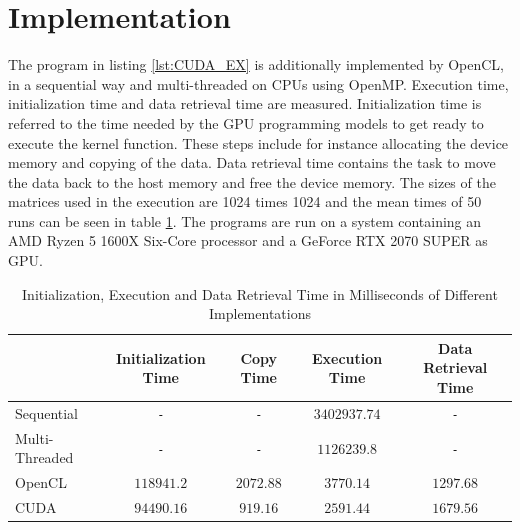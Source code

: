 \section{Implementation}
The program in listing \ref{lst:CUDA_EX} is additionally implemented by OpenCL, in a sequential way and multi-threaded on CPUs using OpenMP.
Execution time, initialization time and data retrieval time are measured.
Initialization time is referred to the time needed by the GPU programming models to get ready to execute the kernel function.
These steps include for instance allocating the device memory and copying of the data.
Data retrieval time contains the task to move the data back to the host memory and free the device memory.
The sizes of the matrices used in the execution are 1024 times 1024 and the mean times of 50 runs can be seen in table \ref{tab:time}.
The programs are run on a system containing an AMD Ryzen 5 1600X Six-Core processor and a GeForce RTX 2070 SUPER as GPU.
\begin{table}[htbp]
  \centering
  \caption{Initialization, Execution and Data Retrieval Time in Milliseconds of Different Implementations}
  \label{tab:time}
  \begin{tabular}{|l|c|c|c|c|}
	\hline
	  & Initialization Time & Copy Time & Execution Time & Data Retrieval Time \\\hline
	  Sequential & \texttt{-} & \texttt{-} & \(3402937.74\) & \texttt{-} \\\hline
	  Multi-Threaded & \texttt{-}& \texttt{-} & \(1126239.8\) & \texttt{-} \\\hline
	  OpenCL & \(118941.2\) & \(2072.88\) & \(3770.14\) & \(1297.68\) \\\hline
	  CUDA & \(94490.16\) & \(919.16\) & \(2591.44\) & \(1679.56\) \\\hline
  \end{tabular}
\end{table}


